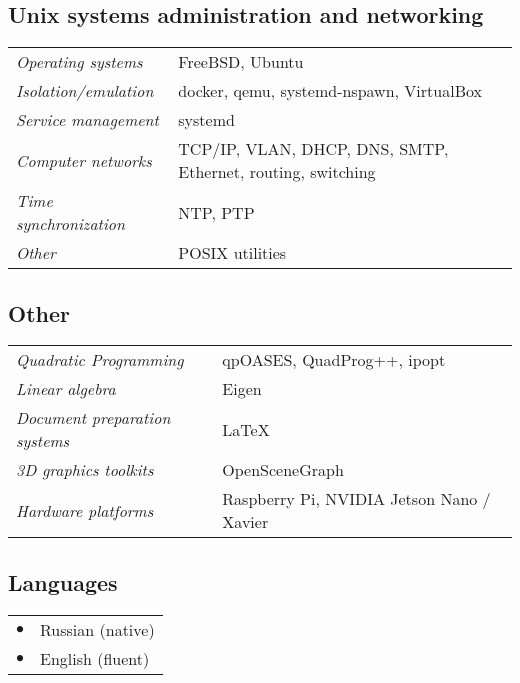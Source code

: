 \documentclass[a4paper,10pt]{report}
\begin{document}
\begin{adjustwidth}{0.5cm}{0pt}
\vspace{0.2cm}
\subsection{Unix systems administration and networking}
\begin{adjustwidth}{0.5cm}{0pt}
    \begin{tabularx}{\linewidth}{l X}
        {\it Operating systems}             & FreeBSD, Ubuntu\\
        {\it Isolation/emulation}           & docker, qemu, systemd-nspawn, VirtualBox\\
        {\it Service management}            & systemd\\
        {\it Computer networks}             & TCP/IP, VLAN, DHCP, DNS, SMTP, Ethernet, routing, switching\\
        {\it Time synchronization}          & NTP, PTP\\
        {\it Other}                         & POSIX utilities
    \end{tabularx}
\end{adjustwidth}

\vspace{0.2cm}
\subsection{Other}
\begin{adjustwidth}{0.5cm}{0pt}
    \begin{tabularx}{\linewidth}{l X}
        {\it Quadratic Programming}         & qpOASES, QuadProg++, ipopt \\
        {\it Linear algebra}                & Eigen\\
        {\it Document preparation systems}  & \LaTeX \\
        {\it 3D graphics toolkits}          & OpenSceneGraph \\
        {\it Hardware platforms}            & Raspberry Pi, NVIDIA Jetson Nano / Xavier \\
    \end{tabularx}
\end{adjustwidth}

\vspace{0.2cm}
\subsection{Languages}
\begin{adjustwidth}{0.5cm}{0pt}
    \begin{tabularx}{\linewidth}{l X}
        \hfill $\bullet$    & Russian (native) \\
        \hfill $\bullet$    & English (fluent)
    \end{tabularx}
\end{adjustwidth}
\end{adjustwidth}
\end{document}
